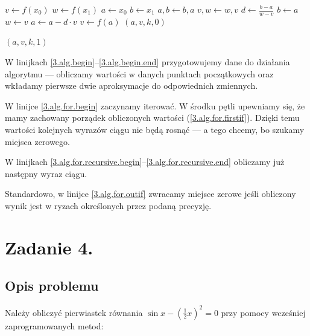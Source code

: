 \documentclass[10pt]{article}
\begin{document}
\begin{algorithm}[H]
    \begin{algorithmic}[1]
      \State $v \gets f(x_0)$\label{3.alg.begin}
      \State $w \gets f(x_1)$
      \State $a \gets x_0$
      \State $b \gets x_1$\label{3.alg.begin.end}
      \label{3.alg.for.begin}
        \label{3.alg.for.firstif}
            \State $a,b \gets b,a$
            \State $v,w \gets w,v$
        \EndIf
        \State $d \gets \frac{b - a}{w - v}$\label{3.alg.for.recursive.begin}
        \State $b \gets a$
        \State $w \gets v$
        \State $a \gets a - d \cdot v$
        \State $v \gets f(a)$\label{3.alg.for.recursive.end}
        \label{3.alg.for.outif}
            \State \Return $(a, v, k, 0)$
        \EndIf
      \EndFor

      \State \Return $(a, v, k, 1)$\label{3.alg.errorif}
    \end{algorithmic}
\end{algorithm}

W linijkach \ref{3.alg.begin}–\ref{3.alg.begin.end} przygotowujemy dane do działania algorytmu — obliczamy wartości w danych punktach początkowych oraz wkładamy pierwsze dwie aproksymacje do odpowiednich zmiennych.

W linijce \ref{3.alg.for.begin} zaczynamy iterować. W środku pętli upewniamy się, że mamy zachowany porządek obliczonych wartości (\ref{3.alg.for.firstif}). Dzięki temu wartości kolejnych wyrazów ciągu nie będą rosnąć — a tego chcemy, bo szukamy miejsca zerowego.

W linijkach \ref{3.alg.for.recursive.begin}–\ref{3.alg.for.recursive.end} obliczamy już następny wyraz ciągu.

Standardowo, w linijce \ref{3.alg.for.outif} zwracamy miejsce zerowe jeśli obliczony wynik jest w ryzach określonych przez podaną precyzję.


\section{Zadanie 4.}

\subsection{Opis problemu}

Należy obliczyć pierwiastek równania $\sin x - \left(\frac{1}{2} x\right)^2 = 0$ przy pomocy wcześniej zaprogramowanych metod:
\end{document}
